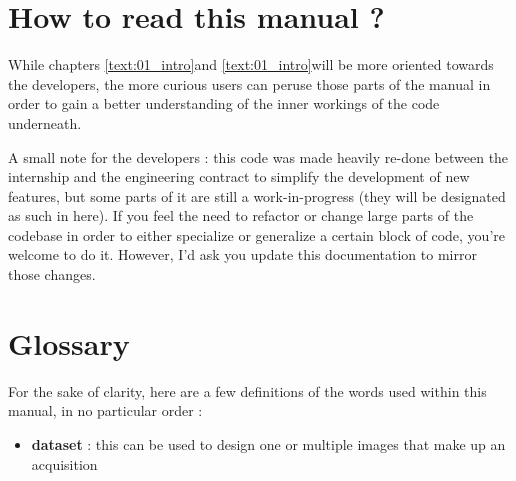 \section{How to read this manual ?}\label{text:01_intro:02_howtoread}
{

	While chapters \ref{text:01_intro}\footnotemark and \ref{text:01_intro}\footnotemark will be more oriented towards the developers, the more curious users can peruse those parts of the manual in order to gain a better understanding of the inner workings of the code underneath.

	A small note for the developers : this code was made heavily re-done between the internship and the engineering contract to simplify the development of new features, but some parts of it are still a work-in-progress (they will be designated as such in here). If you feel the need to refactor or change large parts of the codebase in order to either specialize or generalize a certain block of code, you're welcome to do it. However, I'd ask you update this documentation to mirror those changes.
}

\section{Glossary}\label{text:01_intro:03_definitions}
{
	For the sake of clarity, here are a few definitions of the words used within this manual, in no particular order :

	\begin{itemize}
		\item \textbf{dataset} : this can be used to design one or multiple images that make up an acquisition
	\end{itemize}
}

